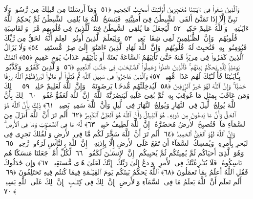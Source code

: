  وَٱلَّذِينَ سَعَوا۟ فِىٓ ءَايَـٰتِنَا مُعَـٰجِزِينَ أُو۟لَـٰٓئِكَ أَصحَـٰبُ ٱلجَحِيمِ ﴿٥١﴾
 وَمَآ أَرسَلنَا مِن قَبلِكَ مِن رَّسُولٍۢ وَلَا نَبِىٍّ إِلَّآ إِذَا تَمَنَّىٰٓ أَلقَى ٱلشَّيطَٰنُ فِىٓ أُمنِيَّتِهِۦ فَيَنسَخُ ٱللَّهُ مَا يُلقِى ٱلشَّيطَٰنُ ثُمَّ يُحكِمُ ٱللَّهُ ءَايَـٰتِهِۦ ۗ وَٱللَّهُ عَلِيمٌ حَكِيمٌۭ ﴿٥٢﴾
 لِّيَجعَلَ مَا يُلقِى ٱلشَّيطَٰنُ فِتنَةًۭ لِّلَّذِينَ فِى قُلُوبِهِم مَّرَضٌۭ وَٱلقَاسِيَةِ قُلُوبُهُم ۗ وَإِنَّ ٱلظَّـٰلِمِينَ لَفِى شِقَاقٍۭ بَعِيدٍۢ ﴿٥٣﴾
 وَلِيَعلَمَ ٱلَّذِينَ أُوتُوا۟ ٱلعِلمَ أَنَّهُ ٱلحَقُّ مِن رَّبِّكَ فَيُؤمِنُوا۟ بِهِۦ فَتُخبِتَ لَهُۥ قُلُوبُهُم ۗ وَإِنَّ ٱللَّهَ لَهَادِ ٱلَّذِينَ ءَامَنُوٓا۟ إِلَىٰ صِرَٰطٍۢ مُّستَقِيمٍۢ ﴿٥٤﴾
 وَلَا يَزَالُ ٱلَّذِينَ كَفَرُوا۟ فِى مِريَةٍۢ مِّنهُ حَتَّىٰ تَأتِيَهُمُ ٱلسَّاعَةُ بَغتَةً أَو يَأتِيَهُم عَذَابُ يَومٍ عَقِيمٍ ﴿٥٥﴾
 ٱلمُلكُ يَومَئِذٍۢ لِّلَّهِ يَحكُمُ بَينَهُم ۚ فَٱلَّذِينَ ءَامَنُوا۟ وَعَمِلُوا۟ ٱلصَّـٰلِحَـٰتِ فِى جَنَّـٰتِ ٱلنَّعِيمِ ﴿٥٦﴾
 وَٱلَّذِينَ كَفَرُوا۟ وَكَذَّبُوا۟ بِـَٔايَـٰتِنَا فَأُو۟لَـٰٓئِكَ لَهُم عَذَابٌۭ مُّهِينٌۭ ﴿٥٧﴾
 وَٱلَّذِينَ هَاجَرُوا۟ فِى سَبِيلِ ٱللَّهِ ثُمَّ قُتِلُوٓا۟ أَو مَاتُوا۟ لَيَرزُقَنَّهُمُ ٱللَّهُ رِزقًا حَسَنًۭا ۚ وَإِنَّ ٱللَّهَ لَهُوَ خَيرُ ٱلرَّٟزِقِينَ ﴿٥٨﴾
 لَيُدخِلَنَّهُم مُّدخَلًۭا يَرضَونَهُۥ ۗ وَإِنَّ ٱللَّهَ لَعَلِيمٌ حَلِيمٌۭ ﴿٥٩﴾
 ۞ ذَٟلِكَ وَمَن عَاقَبَ بِمِثلِ مَا عُوقِبَ بِهِۦ ثُمَّ بُغِىَ عَلَيهِ لَيَنصُرَنَّهُ ٱللَّهُ ۗ إِنَّ ٱللَّهَ لَعَفُوٌّ غَفُورٌۭ ﴿٦٠﴾
 ذَٟلِكَ بِأَنَّ ٱللَّهَ يُولِجُ ٱلَّيلَ فِى ٱلنَّهَارِ وَيُولِجُ ٱلنَّهَارَ فِى ٱلَّيلِ وَأَنَّ ٱللَّهَ سَمِيعٌۢ بَصِيرٌۭ ﴿٦١﴾
 ذَٟلِكَ بِأَنَّ ٱللَّهَ هُوَ ٱلحَقُّ وَأَنَّ مَا يَدعُونَ مِن دُونِهِۦ هُوَ ٱلبَٰطِلُ وَأَنَّ ٱللَّهَ هُوَ ٱلعَلِىُّ ٱلكَبِيرُ ﴿٦٢﴾
 أَلَم تَرَ أَنَّ ٱللَّهَ أَنزَلَ مِنَ ٱلسَّمَآءِ مَآءًۭ فَتُصبِحُ ٱلأَرضُ مُخضَرَّةً ۗ إِنَّ ٱللَّهَ لَطِيفٌ خَبِيرٌۭ ﴿٦٣﴾
 لَّهُۥ مَا فِى ٱلسَّمَـٰوَٟتِ وَمَا فِى ٱلأَرضِ ۗ وَإِنَّ ٱللَّهَ لَهُوَ ٱلغَنِىُّ ٱلحَمِيدُ ﴿٦٤﴾
 أَلَم تَرَ أَنَّ ٱللَّهَ سَخَّرَ لَكُم مَّا فِى ٱلأَرضِ وَٱلفُلكَ تَجرِى فِى ٱلبَحرِ بِأَمرِهِۦ وَيُمسِكُ ٱلسَّمَآءَ أَن تَقَعَ عَلَى ٱلأَرضِ إِلَّا بِإِذنِهِۦٓ ۗ إِنَّ ٱللَّهَ بِٱلنَّاسِ لَرَءُوفٌۭ رَّحِيمٌۭ ﴿٦٥﴾
 وَهُوَ ٱلَّذِىٓ أَحيَاكُم ثُمَّ يُمِيتُكُم ثُمَّ يُحيِيكُم ۗ إِنَّ ٱلإِنسَـٰنَ لَكَفُورٌۭ ﴿٦٦﴾
 لِّكُلِّ أُمَّةٍۢ جَعَلنَا مَنسَكًا هُم نَاسِكُوهُ ۖ فَلَا يُنَـٰزِعُنَّكَ فِى ٱلأَمرِ ۚ وَٱدعُ إِلَىٰ رَبِّكَ ۖ إِنَّكَ لَعَلَىٰ هُدًۭى مُّستَقِيمٍۢ ﴿٦٧﴾
 وَإِن جَٰدَلُوكَ فَقُلِ ٱللَّهُ أَعلَمُ بِمَا تَعمَلُونَ ﴿٦٨﴾
 ٱللَّهُ يَحكُمُ بَينَكُم يَومَ ٱلقِيَـٰمَةِ فِيمَا كُنتُم فِيهِ تَختَلِفُونَ ﴿٦٩﴾
 أَلَم تَعلَم أَنَّ ٱللَّهَ يَعلَمُ مَا فِى ٱلسَّمَآءِ وَٱلأَرضِ ۗ إِنَّ ذَٟلِكَ فِى كِتَـٰبٍ ۚ إِنَّ ذَٟلِكَ عَلَى ٱللَّهِ يَسِيرٌۭ ﴿٧٠﴾
